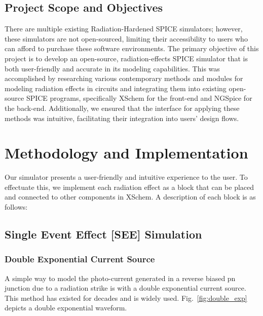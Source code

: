 \documentclass[conference]{IEEEtran}
\begin{document}
    \subsection{Project Scope and Objectives}\label{subsec:project-scope-and-objectives}
    There are multiple existing Radiation-Hardened SPICE simulators; however, these simulators are not open-sourced, limiting their accessibility to users who can afford to purchase these software environments.
    The primary objective of this project is to develop an open-source, radiation-effects SPICE simulator that is both user-friendly and accurate in its modeling capabilities.
    This was accomplished by researching various contemporary methods and modules for modeling radiation effects in circuits and integrating them into existing open-source SPICE programs, specifically XSchem for the front-end and NGSpice for the back-end.
    Additionally, we ensured that the interface for applying these methods was intuitive, facilitating their integration into users' design flows.


    \section{Methodology and Implementation}\label{sec:methodology-and-implementation}
    Our simulator presents a user-friendly and intuitive experience to the user.
    To effectuate this, we implement each radiation effect as a block that can be placed and connected to other components in XSchem.
    A description of each block is as follows:

    

    \subsection{Single Event Effect [SEE] Simulation}\label{subsec:single-event-effect-[see]-simulation}

    \subsubsection{Double Exponential Current Source}
    A simple way to model the photo-current generated in a reverse biased pn junction due to a radiation strike is with a double exponential current source.
    This method has existed for decades and is widely used.
    Fig.~\ref{fig:double_exp} depicts a double exponential waveform.
\end{document}
